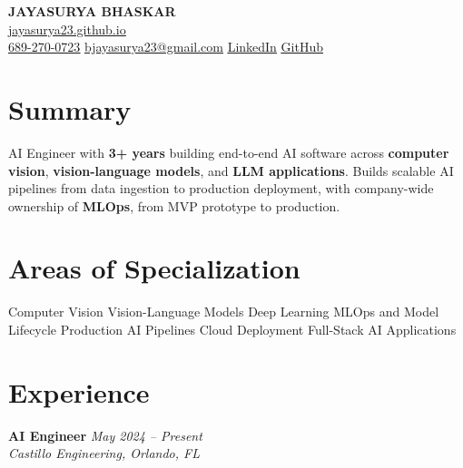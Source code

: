 \documentclass[11pt,letterpaper]{article}
\newcommand{\jobentry}[3]{%
\noindent
\colorbox{bandgray}{%
\begin{minipage}{\dimexpr\linewidth-2\fboxsep-2\fboxrule\relax}
\vspace{2pt}
{\bfseries #1} \hfill {\itshape #3}\\[-0.5pt]
{\itshape #2}
\vspace{2pt}
\end{minipage}%
}%
}
\begin{document}
\raggedright

\begin{center}
{\LARGE \textbf{JAYASURYA BHASKAR}}\\[5pt]
{\large \href{https://jayasurya23.github.io}{\textcolor{blue!70!black}{\underline{jayasurya23.github.io}}}}\\[4pt]
{\small
\href{tel:6892700723}{\underline{689-270-0723}} \;\textbar\;
\href{mailto:bjayasurya23@gmail.com}{\underline{bjayasurya23@gmail.com}} \;\textbar\;
\href{https://www.linkedin.com/in/jayasurya-b/}{\underline{LinkedIn}} \;\textbar\;
\href{https://github.com/jayasurya23}{\underline{GitHub}}}
\end{center}

\vspace{-2pt}

\section{Summary}

AI Engineer with \textbf{3+ years} building end-to-end AI software across
\textbf{computer vision}, \textbf{vision-language models}, and
\textbf{LLM applications}. Builds scalable AI pipelines from data ingestion to
production deployment, with company-wide ownership of \textbf{MLOps}, from MVP
prototype to production.

\section{Areas of Specialization}

Computer Vision \;\textbullet\; Vision-Language Models \;\textbullet\; Deep Learning
\;\textbullet\; MLOps and Model Lifecycle \;\textbullet\; Production AI Pipelines
\;\textbullet\; Cloud Deployment \;\textbullet\; Full-Stack AI Applications

\section{Experience}

\jobentry{AI Engineer}{Castillo Engineering, Orlando, FL}{May 2024 -- Present}
\end{document}
